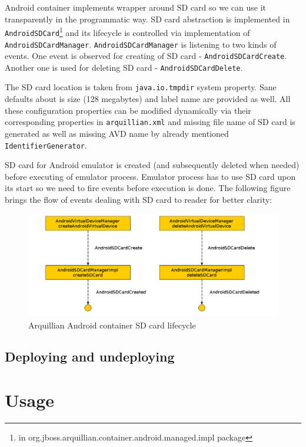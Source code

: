 \documentclass[12pt,final,oneside]{fithesis}
\begin{document}
Android container implements wrapper around SD card so we can use it transparently in the programmatic way. SD card abstraction is implemented in \texttt{AndroidSDCard}\footnote{in org.jboss.arquillian.container.android.managed.impl package} and its lifecycle is controlled via implementation of \texttt{AndroidSDCardManager}. \texttt{AndroidSDCardManager} is listening to two kinds of events. One event is observed for creating of SD card - \texttt{AndroidSDCardCreate}. Another one is used for deleting SD card - \texttt{AndroidSDCardDelete}.

The SD card location is taken from \texttt{java.io.tmpdir} system property. Sane defaults about is size (128 megabytes) and label name are provided as well. All these configuration properties can be modified dynamically via their corresponding properties in \texttt{arquillian.xml} and missing file name of SD card is generated as well as missing AVD name by already mentioned \texttt{IdentifierGenerator}.

SD card for Android emulator is created (and subsequently deleted when needed) before executing of emulator process. Emulator process has to use SD card upon its start so we need to fire events before execution is done. The following figure brings the flow of events dealing with SD card to reader for better clarity:

\begin{figure}[!ht]
	\centering
	\includegraphics[width=120mm]{img/container-sdcards.png}
	\caption{Arquillian Android container SD card lifecycle}
	\label{fig:container_sdcard}
\end{figure}
	
		\subsection{Deploying and undeploying}
	
	\section{Usage}
\end{document}
